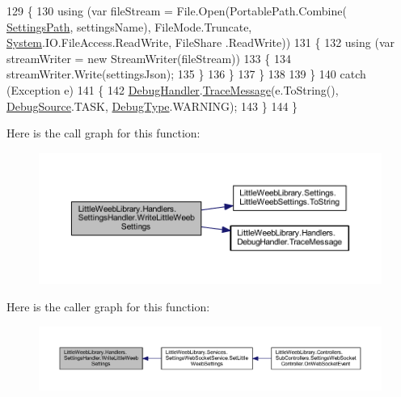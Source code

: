 \begin{DoxyCode}
129                 \{
130                     \textcolor{keyword}{using} (var fileStream = File.Open(PortablePath.Combine(
      \mbox{\hyperlink{class_little_weeb_library_1_1_handlers_1_1_settings_handler_a2e309fc6b949f0bb7e7ace8c2017be7f}{SettingsPath}}, settingsName), FileMode.Truncate, \mbox{\hyperlink{namespace_system}{System}}.IO.FileAccess.ReadWrite, FileShare
      .ReadWrite))
131                     \{
132                         \textcolor{keyword}{using} (var streamWriter = \textcolor{keyword}{new} StreamWriter(fileStream))
133                         \{
134                             streamWriter.Write(settingsJson);
135                         \}
136                     \}
137                 \}
138 
139             \}
140             \textcolor{keywordflow}{catch} (Exception e)
141             \{
142                 \mbox{\hyperlink{class_little_weeb_library_1_1_handlers_1_1_settings_handler_a80da61f3a3fcbb5f9ac6057591a98acf}{DebugHandler}}.\mbox{\hyperlink{interface_little_weeb_library_1_1_handlers_1_1_i_debug_handler_a2e405bc3492e683cd3702fae125221bc}{TraceMessage}}(e.ToString(), 
      \mbox{\hyperlink{namespace_little_weeb_library_1_1_handlers_a2a6ca0775121c9c503d58aa254d292be}{DebugSource}}.TASK, \mbox{\hyperlink{namespace_little_weeb_library_1_1_handlers_ab66019ed40462876ec4e61bb3ccb0a62}{DebugType}}.WARNING);
143             \}
144         \}
\end{DoxyCode}
Here is the call graph for this function\+:\nopagebreak
\begin{figure}[H]
\begin{center}
\leavevmode
\includegraphics[width=350pt]{class_little_weeb_library_1_1_handlers_1_1_settings_handler_af5a1ea4a3605d938b363e83268774d6f_cgraph}
\end{center}
\end{figure}
Here is the caller graph for this function\+:\nopagebreak
\begin{figure}[H]
\begin{center}
\leavevmode
\includegraphics[width=350pt]{class_little_weeb_library_1_1_handlers_1_1_settings_handler_af5a1ea4a3605d938b363e83268774d6f_icgraph}
\end{center}
\end{figure}
